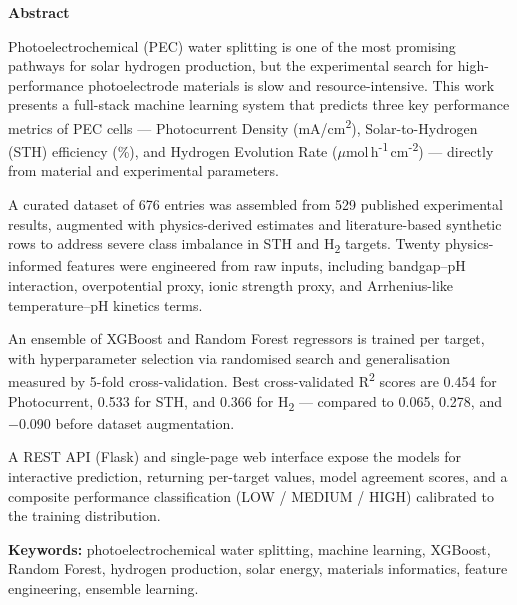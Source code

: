 \newpage
\pagestyle{plain}

\begin{center}
    \Large
    \textbf{Abstract}
\end{center}

\vspace{0.5cm}

Photoelectrochemical (PEC) water splitting is one of the most promising pathways for
solar hydrogen production, but the experimental search for high-performance
photoelectrode materials is slow and resource-intensive.
This work presents a full-stack machine learning system that predicts three key
performance metrics of PEC cells --- Photocurrent Density (mA/cm\textsuperscript{2}),
Solar-to-Hydrogen (STH) efficiency (\%), and Hydrogen Evolution Rate
($\mu$mol\,h\textsuperscript{-1}\,cm\textsuperscript{-2}) --- directly from
material and experimental parameters.

A curated dataset of 676 entries was assembled from 529 published experimental
results, augmented with physics-derived estimates and literature-based synthetic
rows to address severe class imbalance in STH and H\textsubscript{2} targets.
Twenty physics-informed features were engineered from raw inputs, including
bandgap--pH interaction, overpotential proxy, ionic strength proxy, and
Arrhenius-like temperature--pH kinetics terms.

An ensemble of XGBoost and Random Forest regressors is trained per target, with
hyperparameter selection via randomised search and generalisation measured by
5-fold cross-validation.
Best cross-validated R\textsuperscript{2} scores are 0.454 for Photocurrent,
0.533 for STH, and 0.366 for H\textsubscript{2} --- compared to 0.065, 0.278,
and $-$0.090 before dataset augmentation.

A REST API (Flask) and single-page web interface expose the models for
interactive prediction, returning per-target values, model agreement scores,
and a composite performance classification (LOW / MEDIUM / HIGH) calibrated to
the training distribution.

\vspace{0.5cm}
\noindent\textbf{Keywords:} photoelectrochemical water splitting, machine learning,
XGBoost, Random Forest, hydrogen production, solar energy, materials informatics,
feature engineering, ensemble learning.
